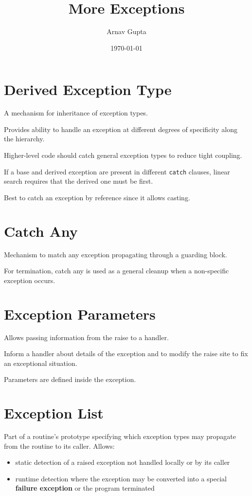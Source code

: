 \documentclass[11pt]{article}
\author{Arnav Gupta}
\date{\today}
\title{More Exceptions}
\begin{document}
\maketitle
\tableofcontents

\section{Derived Exception Type}
\label{sec:org42deb01}
A mechanism for inheritance of exception types.

Provides ability to handle an exception at different degrees of specificity along the hierarchy.

Higher-level code should catch general exception types to reduce tight coupling.

If a base and derived exception are present in different \texttt{catch} clauses, linear search requires that
the derived one must be first.

Best to catch an exception by reference since it allows casting.
\section{Catch Any}
\label{sec:org1d3428c}
Mechanism to match any exception propagating through a guarding block.

For termination, catch any is used as a general cleanup when a non-specific exception occurs.
\section{Exception Parameters}
\label{sec:orge0b0a94}
Allows passing information from the raise to a handler.

Inform a handler about details of the exception and to modify the raise site to fix an exceptional
situation.

Parameters are defined inside the exception.
\section{Exception List}
\label{sec:org653a6de}
Part of a routine's prototype specifying which exception types may propagate from the routine to its
caller.
Allows:
\begin{itemize}
\item static detection of a raised exception not handled locally or by its caller
\item runtime detection where the exception may be converted into a special \textbf{failure exception} or
the program terminated
\end{itemize}
\end{document}
